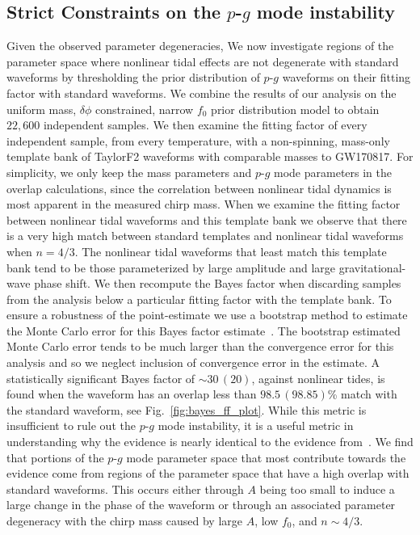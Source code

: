 \subsection{Strict Constraints on the $p$-$g$ mode instability}
Given the observed parameter degeneracies, We now investigate regions of the parameter space where nonlinear tidal effects are not degenerate with standard waveforms by thresholding the prior distribution of $p$-$g$ waveforms on their fitting factor with standard waveforms. We combine the results of our analysis on the uniform mass, $\delta \phi$ constrained, narrow $f_0$ prior distribution model to obtain $22,600$ independent samples. We then examine the fitting factor of every independent sample, from every temperature, with a non-spinning, mass-only template bank of TaylorF2 waveforms with comparable masses to GW170817. For simplicity, we only keep the mass parameters and $p$-$g$ mode parameters in the overlap calculations, since the correlation between nonlinear tidal dynamics is most apparent in the measured chirp mass. When we examine the fitting factor between nonlinear tidal waveforms and this template bank we observe that there is a very high match between standard templates and nonlinear tidal waveforms when $n = 4/3$. The nonlinear tidal waveforms that least match this template bank tend to be those parameterized by large amplitude and large gravitational-wave phase shift. We then recompute the Bayes factor when discarding samples from the analysis below a particular fitting factor with the template bank. To ensure a robustness of the point-estimate we use a bootstrap method to estimate the Monte Carlo error for this Bayes factor estimate~\citep{efron1992bootstrap}. The bootstrap estimated Monte Carlo error tends to be much larger than the convergence error for this analysis and so we neglect inclusion of convergence error in the estimate. A statistically significant Bayes factor of $\sim 30 \, (20)$, against nonlinear tides, is found when the waveform has an overlap less than $98.5 \, (98.85)$\% match with the standard waveform, see Fig.~\ref{fig:bayes_ff_plot}. While this metric is insufficient to rule out the $p$-$g$ mode instability, it is a useful metric in understanding why the evidence is nearly identical to the evidence from~\cite{de2018tidal}. We find that portions of the $p$-$g$ mode parameter space that most contribute towards the evidence come from regions of the parameter space that have a high overlap with standard waveforms. This occurs either through $A$ being too small to induce a large change in the phase of the waveform or through an associated parameter degeneracy with the chirp mass caused by large $A$, low $f_0$, and $n \sim 4/3$.

